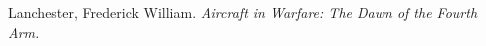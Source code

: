 \documentclass[10pt,journal,compsoc]{IEEEtran}
\begin{document}












%
%
%
\begin{thebibliography}{1}



 Lanchester, Frederick William. \emph{Aircraft in Warfare: The Dawn of the Fourth Arm.}


\end{thebibliography}
\end{document}
